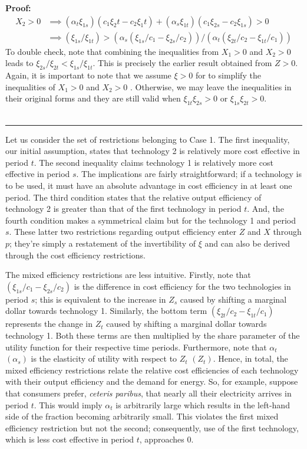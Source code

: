 \documentclass[11pt,a4paper]{extarticle}
\newenvironment{proof}[1][Proof]{\noindent\textbf{#1:} }{\ \rule{0.5em}{0.5em}}
\begin{document}
\begin{proof}
	\begin{align*}
	X_2 > 0 &\implies (\alpha_t \xi_{1s})(c_1 \xi_2t - c_2\xi_1t) + (\alpha_s \xi_{1t})(c_1 \xi_{2s} - c_2 \xi_{1s}) > 0\\
	&\implies (\xi_{1s}/\xi_{1t}) > (\alpha_s (\xi_{1s}/c_1 -  \xi_{2s}/c_2))/(\alpha_t(\xi_{2t}/c_2 - \xi_{1t}/c_1)) 
	\end{align*}
	To double check, note that combining the inequalities from $X_1>0$ and $X_2 > 0$ leads to $\xi_{2s}/\xi_{2t} < \xi_{1s}/\xi_{1t}$. This is precisely the earlier result obtained from $Z > 0$. Again, it is  important to note that we assume $\xi > 0$ for to simplify the inequalities of $X_1 > 0$ and $X_2 > 0$ . Otherwise, we may leave the inequalities in their original forms and they are still valid when  $\xi_{1t} \xi_{2s} > 0$ or $\xi_{1s} \xi_{2t} > 0$.   \\ \hfill
\end{proof}

Let us consider the set of restrictions belonging to Case 1. The first inequality, our initial assumption, states that technology 2 is relatively more cost effective in period $t$. The second inequality claims technology 1 is relatively more cost effective in period $s$. The implications are fairly straightforward; if a technology is to be used, it must have an absolute advantage in cost efficiency in at least one period. The third condition states that the relative output efficiency of technology 2 is greater than that of the first technology in period $t$. And, the fourth condition makes a symmetrical claim but for the technology 1 and period $s$. These latter two restrictions regarding output efficiency enter $Z$ and $X$ through $p$; they're simply a restatement of the invertibility of $\xi$ and can also be derived through the cost efficiency restrictions. 

The mixed efficiency restrictions are less intuitive. Firstly, note that $\left(\xi_{1s}/c_1 - \xi_{2s}/c_2\right)$ is the difference in cost efficiency for the two technologies in period $s$; this is equivalent to the increase in $Z_s$ caused by shifting a marginal dollar towards technology 1. Similarly, the bottom term $\left( \xi_{2t}/c_2 - \xi_{1t}/c_1 \right)$ represents the change in $Z_t$ caused by shifting a marginal dollar towards technology 1. Both these terms are then multiplied by the share parameter of the utility function for their respective time periods. Furthermore, note that $\alpha_t$ $(\alpha_s)$ is the elasticity of utility with respect to $Z_t$ $(Z_t)$. Hence, in total, the mixed efficiency restrictions relate the relative cost efficiencies of each technology with their output efficiency and the demand for energy. So, for example, suppose that consumers prefer, \textit{ceteris paribus}, that nearly all their electricity arrives in period $t$. This would imply $\alpha_t$ is arbitrarily large which results in the left-hand side of the fraction becoming arbitrarily small. This violates the first mixed efficiency restriction but not the second; consequently, use of the first technology, which is less cost effective in period $t$, approaches $0$. 
\end{document}
